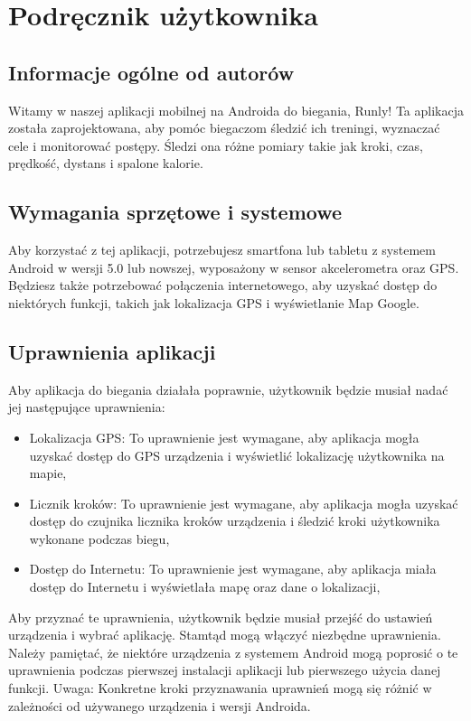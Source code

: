	\newpage
\section{Podręcznik użytkownika}  %

\subsection{Informacje ogólne od autorów} %

\hspace{0.60cm}Witamy w naszej aplikacji mobilnej na Androida do biegania, Runly! Ta aplikacja została zaprojektowana, aby pomóc biegaczom śledzić ich treningi, wyznaczać cele i monitorować postępy. Śledzi ona różne pomiary takie jak kroki, czas, prędkość, dystans i spalone kalorie.

\subsection{Wymagania sprzętowe i systemowe} %

\hspace{0.60cm}Aby korzystać z tej aplikacji, potrzebujesz smartfona lub tabletu z systemem Android w wersji 5.0 lub nowszej, wyposażony w sensor akcelerometra oraz GPS. Będziesz także potrzebować połączenia internetowego, aby uzyskać dostęp do niektórych funkcji, takich jak lokalizacja GPS i wyświetlanie Map Google.

\subsection{Uprawnienia aplikacji}

\hspace{0.60cm}Aby aplikacja do biegania działała poprawnie, użytkownik będzie musiał nadać jej następujące uprawnienia:

\begin{itemize}
	\item Lokalizacja GPS: To uprawnienie jest wymagane, aby aplikacja mogła uzyskać dostęp do GPS urządzenia i wyświetlić lokalizację użytkownika na mapie,
	\item Licznik kroków: To uprawnienie jest wymagane, aby aplikacja mogła uzyskać dostęp do czujnika licznika kroków urządzenia i śledzić kroki użytkownika wykonane podczas biegu,
	\item Dostęp do Internetu: To uprawnienie jest wymagane, aby aplikacja miała dostęp do Internetu i wyświetlała mapę oraz dane o lokalizacji,
\end{itemize}
Aby przyznać te uprawnienia, użytkownik będzie musiał przejść do ustawień urządzenia i wybrać aplikację. Stamtąd mogą włączyć niezbędne uprawnienia. Należy pamiętać, że niektóre urządzenia z systemem Android mogą poprosić o te uprawnienia podczas pierwszej instalacji aplikacji lub pierwszego użycia danej funkcji. Uwaga: Konkretne kroki przyznawania uprawnień mogą się różnić w zależności od używanego urządzenia i wersji Androida.

